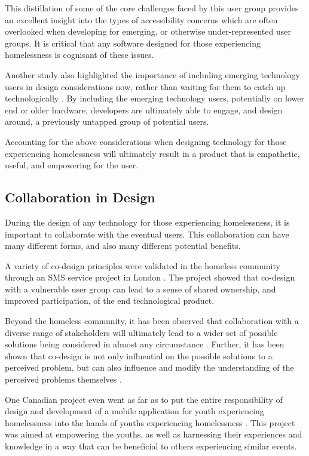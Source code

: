 This distillation of some of the core challenges faced by this user group provides an excellent insight into the types of accessibility concerns which are often overlooked when developing for emerging, or otherwise under-represented user groups. It is critical that any software designed for those experiencing homelessness is cognisant of these issues.

Another study also highlighted the importance of including emerging technology users in design considerations now, rather than waiting for them to catch up technologically \cite{jones2017beyond}. By including the emerging technology users, potentially on lower end or older hardware, developers are ultimately able to engage, and design around, a previously untapped group of potential users.

Accounting for the above considerations when designing technology for those experiencing homelessness will ultimately result in a product that is empathetic, useful, and empowering for the user.

\subsection{Collaboration in Design}

During the design of any technology for those experiencing homelessness, it is important to collaborate with the eventual users. This collaboration can have many different forms, and also many different potential benefits.

A variety of co-design principles were validated in the homeless community through an SMS service project in London \cite{kwon2013co}. The project showed that co-design with a vulnerable user group can lead to a sense of shared ownership, and improved participation, of the end technological product.

Beyond the homeless community, it has been observed that collaboration with a diverse range of stakeholders will ultimately lead to a wider set of possible solutions being considered in almost any circumstance \cite{doberstein2016designing}. Further, it has been shown that co-design is not only influential on the possible solutions to a perceived problem, but can also influence and modify the understanding of the perceived problems themselves \cite{melles2012empower}.

One Canadian project even went as far as to put the entire responsibility of design and development of a mobile application for youth experiencing homelessness into the hands of youths experiencing homelessness \cite{buccieri2015empowering}. This project was aimed at empowering the youths, as well as harnessing their experiences and knowledge in a way that can be beneficial to others experiencing similar events.

